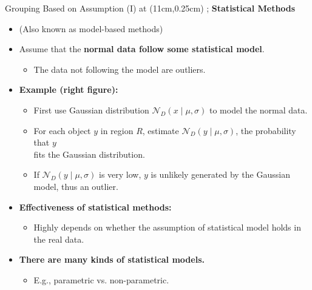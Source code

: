 \begin{frame}{Grouping Based on Assumption (I)}
	\tikzoverlay at (11cm,0.25cm) {};
	\textcolor{faugray}{\textbf{Statistical Methods}}
	\begin{itemize}
		\item (Also known as model-based methods)
		\item Assume that the \textbf{\color{airforceblue}normal data follow some statistical model}.
		      \begin{itemize}
			      \item The data not following the model are outliers.
		      \end{itemize}
		\item \textbf{Example (right figure):}
		      \begin{itemize}
			      \item First use Gaussian distribution $\mathcal{N}_D(x \; \vert \; \mu,\sigma)$ to model the normal data.
			      \item For each object $y$ in region $R$, estimate $\mathcal{N}_D(y \; \vert \; \mu, \sigma)$, the probability that $y$ \\
			            fits the Gaussian distribution.
			      \item If $\mathcal{N}_D(y \; \vert \; \mu, \sigma)$ is very low, $y$ is unlikely generated by the Gaussian model, thus an outlier.
		      \end{itemize}
		\item\textbf{Effectiveness of statistical methods:}
		      \begin{itemize}
			      \item Highly depends on whether the assumption of statistical model holds in the real data.
		      \end{itemize}
		\item \textbf{There are many kinds of statistical models.}
		      \begin{itemize}
			      \item E.g., parametric vs. non-parametric.
		      \end{itemize}
	\end{itemize}
\end{frame}


